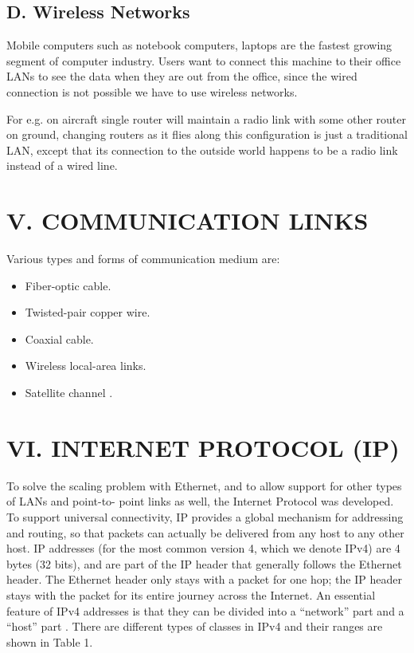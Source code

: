 \documentclass[12pt]{article}
\begin{document}
\begin{multicols*}{2}
\subsection*{D. Wireless Networks}
\indent \indent Mobile computers such as notebook computers,
laptops are the fastest growing segment of computer
industry. Users want to connect this machine to their office LANs to see the data when they are out from the
office, since the wired connection is not possible we
have to use wireless networks.

For e.g. on aircraft single router will maintain a
radio link with some other router on ground, changing
routers as it flies along this configuration is just a
traditional LAN, except that its connection to the
outside world happens to be a radio link instead of a
wired line.

\section*{V. COMMUNICATION LINKS}
Various types and forms of communication
medium are:
\begin{itemize}
  \item Fiber-optic cable.
  \item Twisted-pair copper wire.
  \item Coaxial cable.
  \item Wireless local-area links.
  \item Satellite channel \cite{3}.
\end{itemize}

\section*{VI. INTERNET PROTOCOL (IP)}
To solve the scaling problem with Ethernet, and
to allow support for other types of LANs and point-to-
point links as well, the Internet Protocol was developed.
To support universal connectivity, IP provides a global
mechanism for addressing and routing, so that packets
can actually be delivered from any host to any other
host. IP addresses (for the most common version 4,
which we denote IPv4) are 4 bytes (32 bits), \cite{6} and are
part of the IP header that generally follows the Ethernet
header. The Ethernet header only stays with a packet
for one hop; the IP header stays with the packet for its
entire journey across the Internet. An essential feature
of IPv4 addresses is that they can be divided into a
“network” part and a “host” part \cite{5}. There are different
types of classes in IPv4 and their ranges are shown in
Table 1.\\


\end{multicols*}
\end{document}
